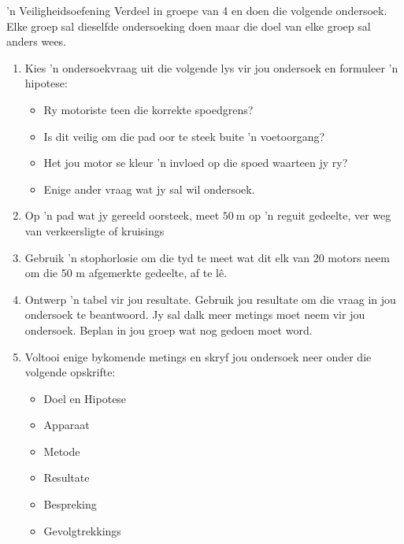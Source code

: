 \begin{Investigation}{ 'n Veiligheidsoefening}
            \nopagebreak
Verdeel in groepe van 4 en doen die volgende ondersoek. Elke groep sal dieselfde ondersoeking doen maar die doel van elke groep sal anders wees.\par

\begin{enumerate}[noitemsep, label=\textbf{\arabic*}. ] 
    \item Kies 'n ondersoekvraag uit die volgende lys vir jou ondersoek en formuleer 'n hipotese:
    \begin{itemize}[noitemsep]
        \item Ry motoriste teen die korrekte spoedgrens?
        \item Is dit veilig om die pad oor te steek buite 'n voetoorgang?
        \item Het jou motor se kleur 'n invloed op die spoed waarteen jy ry?
        \item Enige ander vraag wat jy sal wil ondersoek.
\end{itemize}

\item Op 'n pad wat jy gereeld oorsteek, meet $50~\text{m}$ op 'n reguit gedeelte, ver weg van verkeers\-ligte of kruisings
\item Gebruik 'n stophorlosie om die tyd te meet wat dit elk van 20 motors neem om die 50 m afgemerkte gedeelte, af te l\^e. 
\item Ontwerp 'n tabel vir jou resultate. Gebruik jou resultate om die vraag in jou ondersoek te beantwoord. Jy sal dalk meer metings moet neem vir jou ondersoek. Beplan in jou groep wat nog gedoen moet word.
\item Voltooi enige bykomende metings en skryf jou ondersoek neer onder die volgende opskrifte:
\begin{itemize}[noitemsep]
    \item Doel en Hipotese
    \item Apparaat
    \item Metode
    \item Resultate
    \item Bespreking
    \item Gevolgtrekkings
\end{itemize}


\end{enumerate}
\end{Investigation}
